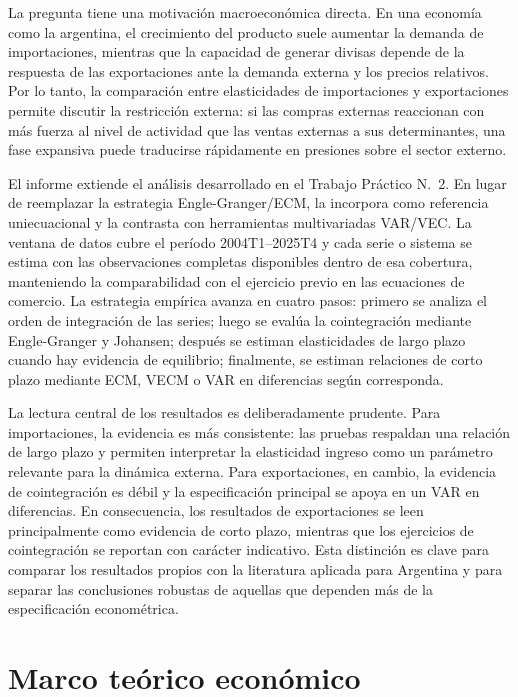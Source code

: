 \documentclass[11pt,a4paper]{article}
\begin{document}
	La pregunta tiene una motivación macroeconómica directa. En una economía como la
	argentina, el crecimiento del producto suele aumentar la demanda de
	importaciones, mientras que la capacidad de generar divisas depende de la
	respuesta de las exportaciones ante la demanda externa y los precios relativos.
	Por lo tanto, la comparación entre elasticidades de importaciones y
	exportaciones permite discutir la restricción externa: si las compras externas
	reaccionan con más fuerza al nivel de actividad que las ventas externas a sus
	determinantes, una fase expansiva puede traducirse rápidamente en presiones
	sobre el sector externo.

	El informe extiende el análisis desarrollado en el Trabajo Práctico
	N.\textdegree~2. En lugar de reemplazar la estrategia Engle-Granger/ECM, la
	incorpora como referencia uniecuacional y la contrasta con herramientas
	multivariadas VAR/VEC. La ventana de datos cubre el período 2004T1--2025T4 y
	cada serie o sistema se estima con las observaciones completas disponibles
	dentro de esa cobertura, manteniendo la comparabilidad con el ejercicio previo
	en las ecuaciones de comercio. La estrategia empírica avanza en cuatro pasos:
	primero se analiza el orden de integración de las series; luego se evalúa la
	cointegración mediante Engle-Granger y Johansen; después se estiman
	elasticidades de largo plazo cuando hay evidencia de equilibrio; finalmente, se
	estiman relaciones de corto plazo mediante ECM, VECM o VAR en diferencias según
	corresponda.

	La lectura central de los resultados es deliberadamente prudente. Para
	importaciones, la evidencia es más consistente: las pruebas respaldan una
	relación de largo plazo y permiten interpretar la elasticidad ingreso como un
	parámetro relevante para la dinámica externa. Para exportaciones, en cambio, la
	evidencia de cointegración es débil y la especificación principal se apoya en un
	VAR en diferencias. En consecuencia, los resultados de exportaciones se leen
	principalmente como evidencia de corto plazo, mientras que los ejercicios de
	cointegración se reportan con carácter indicativo. Esta distinción es clave para
	comparar los resultados propios con la literatura aplicada para Argentina y para
	separar las conclusiones robustas de aquellas que dependen más de la
	especificación econométrica.

	\section{Marco teórico económico}
	\label{sec:marco-teorico}
\end{document}
